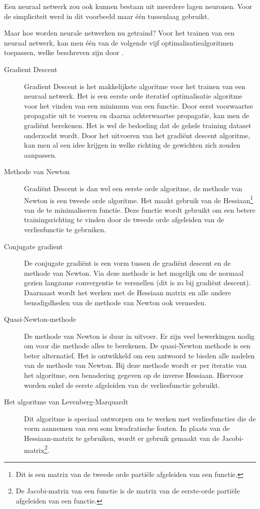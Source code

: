 Een neuraal netwerk zou ook kunnen bestaan uit meerdere lagen neuronen. Voor de simpliciteit werd in dit voorbeeld maar één tussenlaag gebruikt.

Maar hoe worden neurale netwerken nu getraind? Voor het trainen van een neuraal netwerk, kan men één van de volgende vijf optimalisatiealgoritmen toepassen, welke beschreven zijn door \textcite{neuraldesigners}.

\begin{description}
	\item[Gradient Descent] Gradient Descent is het makkelijkste algoritme voor het trainen van een neuraal netwerk. Het is een eerste orde iteratief optimalisatie algoritme voor het vinden van een minimum van een functie. Door eerst voorwaartse propagatie uit te voeren en daarna achterwaartse propagatie, kan men de gradiënt berekenen. Het is wel de bedoeling dat de gehele training dataset onderzocht wordt. Door het uitvoeren van het gradiënt descent algoritme, kan men al een idee krijgen in welke richting de gewichten zich zouden aanpassen.
	\item[Methode van Newton] Gradiënt Descent is dan wel een eerste orde algoritme, de methode van Newton is een tweede orde algoritme. Het maakt gebruik van de Hessiaan\footnote{Dit is een matrix van de tweede orde partiële afgeleiden van een functie.} van de te minimaliseren functie. Deze functie wordt gebruikt om een betere trainingsrichting te vinden door de tweede orde afgeleiden van de verliesfunctie te gebruiken.
	\item[Conjugate gradient] De conjugate gradiënt is een vorm tussen de gradiënt descent en de methode van Newton. Via deze methode is het mogelijk om de normaal gezien langzame convergentie te versnellen (dit is zo bij gradiënt descent). Daarnaast wordt het werken met de Hessiaan matrix en alle andere benodigdheden van de methode van Newton ook vermeden.
	\item[Quasi-Newton-methode] De methode van Newton is duur in uitvoer. Er zijn veel bewerkingen nodig om voor die methode alles te berekenen. De quasi-Newton methode is een beter alternatief. Het is ontwikkeld om een antwoord te bieden alle nadelen van de methode van Newton. Bij deze methode wordt er per iteratie van het algoritme, een benadering gegeven op de inverse Hessiaan. Hiervoor worden enkel de eerste afgeleiden van de verliesfunctie gebruikt.
	\item[Het algoritme van Levenberg-Marquardt] Dit algoritme is speciaal ontworpen om te werken met verliesfuncties die de vorm aannemen van een som kwadratische fouten. In plaats van de Hessiaan-matrix te gebruiken, wordt er gebruik gemaakt van de Jacobi-matrix\footnote{De Jacobi-matrix van een functie is de matrix van de eerste-orde partiële afgeleiden van een functie.}.
\end{description}

